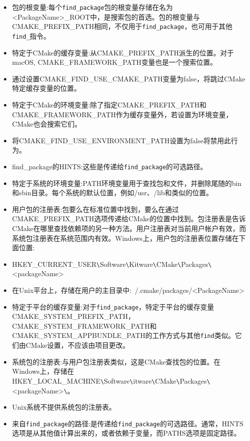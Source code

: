 \begin{itemize}
\item 
包的根变量:每个\texttt{find\_package}包的根变量存储在名为<PackageName>\_ROOT中，是搜索包的首选。包的根变量与CMAKE\_PREFIX\_PATH相同，不仅用于\texttt{find\_package}，也可用于其他\texttt{find\_}指令。

\item 
特定于CMake的缓存变量:从CMAKE\_PREFIX\_PATH派生的位置。对于macOS, CMAKE\_FRAMEWORK\_PATH变量也是一个搜索位置。

\item 
通过设置CMAKE\_FIND\_USE\_CMAKE\_PATH变量为false，将跳过CMake特定缓存变量的位置。

\item 
特定于CMake的环境变量:除了指定CMAKE\_PREFIX\_PATH和CMAKE\_FRAMEWORK\_PATH作为缓存变量外，若设置为环境变量，CMake也会搜索它们。

\item 
将CMAKE\_FIND\_USE\_ENVIRONMENT\_PATH设置为false将禁用此行为。

\item 
find\_package的HINTS:这些是传递给\texttt{find\_package}的可选路径。

\item 
特定于系统的环境变量:PATH环境变量用于查找包和文件，并删除尾随的bin和sbin目录。每个系统的默认位置，例如/usr、/lib和类似的位置。

\item 
用户包的注册表:包要么在标准位置中找到，要么在通过CMAKE\_PREFIX\_PATH选项传递给CMake的位置中找到。包注册表是告诉CMake在哪里查找依赖项的另一种方法。用户注册表对当前用户帐户有效，而系统包注册表在系统范围内有效。Windows上，用户包的注册表位置存储在下面位置:

\item 
HKEY\_CURRENT\_USER\verb|\|Software\verb|\|Kitware\verb|\|CMake\verb|\|Packages\verb|\|<packageName>\

\item 
在Unix平台上，存储在用户的主目录中:~/.cmake/packages/<PackageName>

\item 
特定于平台的缓存变量:对于\texttt{find\_package}，特定于平台的缓存变量CMAKE\_SYSTEM\_PREFIX\_PATH，CMAKE\_SYSTEM\_FRAMEWORK\_PATH和CMAKE\_SYSTEM\_APPBUNDLE\_PATH的工作方式与其他\texttt{find}类似。它们由CMake设置，不应该由项目更改。

\item 
系统包的注册表:与用户包注册表类似，这是CMake查找包的位置。在Windows上，存储在 HKEY\_LOCAL\_MACHINE\verb|\|Software\verb|\|itware\verb|\|CMake\verb|\|Packages\verb|\|<packageName>\verb|\|。

\item 
Unix系统不提供系统包的注册表。

\item 
来自\texttt{find\_package}的路径:是传递给\texttt{find\_package}的可选路径。通常，HINTS选项是从其他值计算出来的，或者依赖于变量，而PATHS选项是固定路径。
\end{itemize}

